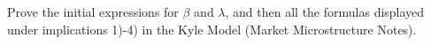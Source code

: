 Prove the initial expressions for \(\beta\) and \(\lambda\), and then all the formulas displayed under implications 1)-4) in the Kyle Model (Market Microstructure Notes).
